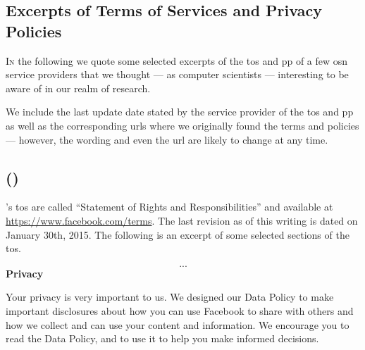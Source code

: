 
\begin{appendices}
    \renewcommand\thechapter{\greek{chapter}}
    \renewcommand\thesection{\thechapter.\greek{section}}

    \chapter{Excerpts of Terms of Services and Privacy Policies}
        \label{chapter:thesis:excerpts-of-tos-and-pp}
    
    \lettrine{\textcolor[gray]{.25}{I}}{n} the following  we quote some 
    selected excerpts of the \ac{tos} and \ac{pp} of a few \ac{osn} service providers 
    that we thought --- as computer scientists --- interesting to be aware of in 
    our realm of research.
    
    We include the last update date stated by the service provider of the \ac{tos} 
    and \ac{pp} as well as the corresponding \acp{url} where we originally found 
    the terms and policies --- however, the wording and even the \ac{url} are likely 
    to change at any time.

    \section[\Facebook]{\Facebook (\FacebookInc)}
        \label{section:thesis:excerpts-facebook}
    \Facebook's \acs{tos} are called ``Statement of Rights and Responsibilities'' 
    and available at \url{https://www.facebook.com/terms}. The last revision as 
    of this writing is dated on January 30th, 2015. The following is an excerpt 
    of some selected sections of the \ac{tos}.

    \begin{quote_tos}
        \[...\]
        \textbf{Privacy}

        Your privacy is very important to us. We designed our Data Policy to make important 
        disclosures about how you can use Facebook to share with others and how we collect 
        and can use your content and information. We encourage you to read the Data Policy, 
        and to use it to help you make informed decisions. 


\end{quote_tos}
\end{appendices}
